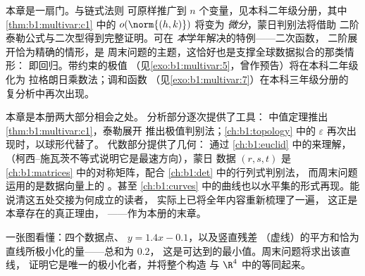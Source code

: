 \begin{remark}[双变量的去向]
\label{rem:b1:multivar:whereused}
本章是一扇门。与链式法则
可原样推广到 $n$ 个变量，见本科二年级分册，其中
\cref{thm:b1:multivar:c1} 中的 $o(\norm{(h,k)})$ 将变为
\emph{微分}，蒙日判别法将借助
二阶泰勒公式与二次型得到完整证明。可在
\emph{本}学年解决的特例——二次函数，
二阶展开恰为精确的情形，是
周末问题的主题，这恰好也是支撑全球数据拟合的那类情形：
即回归。带约束的极值
（见\cref{exo:b1:multivar:5}，曾作预告）将在本科二年级化为
拉格朗日乘数法；调和函数
（见\cref{exo:b1:multivar:7}）在本科三年级分册的
复分析中再次出现。
\end{remark}

\begin{remark}
\label{rem:b1:multivar:perspectives}
本章是本册两大部分相会之处。
分析部分逐次提供了工具：
中值定理推出 \cref{thm:b1:multivar:c1}，泰勒展开
推出极值判别法；\cref{ch:b1:topology} 中的 $\varepsilon$
再次出现时，以球形代替了。
代数部分提供了几何：
通过 \cref{ch:b1:euclid} 中的来理解，
（柯西–施瓦茨不等式说明它是最速方向），蒙日
数据 $(r, s, t)$ 是
\cref{ch:b1:matrices} 中的对称矩阵，配合 \cref{ch:b1:det} 中的行列式判别法，
而周末问题运用的是数据向量上的
。甚至
\cref{ch:b1:curves} 中的曲线也以水平集的形式再现。能说清这五处交接为何成立的读者，
实际上已将全年内容重新梳理了一遍，
这正是本章存在的真正理由，
——作为本册的末章。
\end{remark}

\begin{omfigure}

{\small 一张图看懂：四个数据点、
 $y = 1.4x - 0.1$，以及竖直残差
（虚线）的平方和恰为直线所极小化的量——总和为 $0.2$，
这是可达到的最小值。周末问题将求出该直线，
证明它是唯一的极小化者，并将整个构造
与 $\R^4$ 中的等同起来。}
\end{omfigure}

